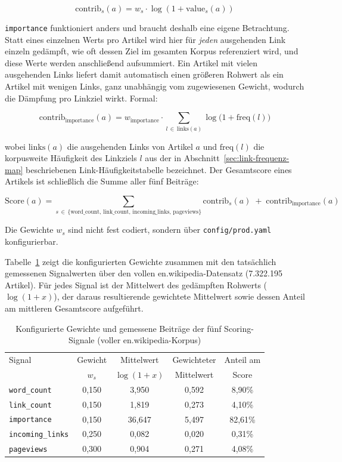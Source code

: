 \[
\mathrm{contrib}_s(a) = w_s \cdot \log\left(1 + \mathrm{value}_s(a)\right)
\]

\texttt{importance} funktioniert anders und braucht deshalb eine eigene Betrachtung. Statt eines einzelnen
Werts pro Artikel wird hier für \emph{jeden} ausgehenden Link einzeln gedämpft, wie oft dessen Ziel im
gesamten Korpus referenziert wird, und diese Werte werden anschließend aufsummiert. Ein Artikel mit vielen
ausgehenden Links liefert damit automatisch einen größeren Rohwert als ein Artikel mit wenigen Links, ganz
unabhängig vom zugewiesenen Gewicht, wodurch die Dämpfung pro Linkziel wirkt. Formal:

\[
\mathrm{contrib}_{\mathrm{importance}}(a) = w_{\mathrm{importance}} \cdot \sum_{l \,\in\, \mathrm{links}(a)} \log\bigl(1 + \mathrm{freq}(l)\bigr)
\]

wobei $\mathrm{links}(a)$ die ausgehenden Links von Artikel $a$ und $\mathrm{freq}(l)$ die korpusweite
Häufigkeit des Linkziels $l$ aus der in Abschnitt~\ref{sec:link-frequenz-map} beschriebenen
Link-Häufigkeitstabelle bezeichnet. Der Gesamtscore eines Artikels ist schließlich die Summe aller fünf
Beiträge:

\[
\mathrm{Score}(a) = \sum_{s \,\in\, \{\mathrm{word\_count},\, \mathrm{link\_count},\, \mathrm{incoming\_links},\, \mathrm{pageviews}\}} \mathrm{contrib}_s(a) \;+\; \mathrm{contrib}_{\mathrm{importance}}(a)
\]

Die Gewichte $w_s$ sind nicht fest codiert, sondern über \texttt{config/prod.yaml} konfigurierbar.

Tabelle~\ref{tab:scoring-weights} zeigt die konfigurierten Gewichte zusammen mit den tatsächlich gemessenen
Signalwerten über den vollen en.wikipedia-Datensatz (7.322.195 Artikel). Für jedes Signal ist der Mittelwert des
gedämpften Rohwerts ($\log(1+x)$), der daraus resultierende gewichtete Mittelwert sowie dessen Anteil am
mittleren Gesamtscore aufgeführt.

\begin{table}[ht]
    \centering
    \small
    \caption{Konfigurierte Gewichte und gemessene Beiträge der fünf Scoring-Signale (voller en.wikipedia-Korpus)}
    \label{tab:scoring-weights}
    \begin{tabular}{lcccc}
        \toprule
        Signal & Gewicht & Mittelwert & Gewichteter & Anteil am \\
               & $w_s$ & $\log(1{+}x)$ & Mittelwert & Score \\
        \midrule
        \texttt{word\_count}     & 0,150 & 3,950  & 0,592 & 8,90\%  \\
        \texttt{link\_count}     & 0,150 & 1,819  & 0,273 & 4,10\%  \\
        \texttt{importance}      & 0,150 & 36,647 & 5,497 & 82,61\% \\
        \texttt{incoming\_links} & 0,250 & 0,082  & 0,020 & 0,31\%  \\
        \texttt{pageviews}       & 0,300 & 0,904  & 0,271 & 4,08\%  \\
        \bottomrule
    \end{tabular}
\end{table}

